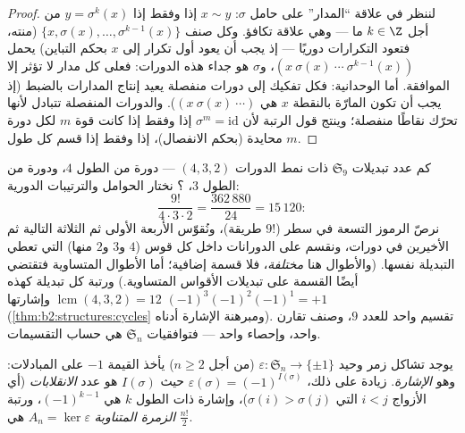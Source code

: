 \begin{proof}
لننظر في علاقة ``المدار'' على حامل $\sigma$: $x \sim y$
إذا وفقط إذا $y = \sigma^k(x)$ من أجل $k \in \Z$ ما --- وهي علاقة
تكافؤ. وكل صنف $\{x, \sigma(x), \dots, \sigma^{k-1}(x)\}$
(منته، فتعود التكرارات دوريًا --- إذ يجب أن يعود أول تكرار
إلى $x$ بحكم التباين) يحمل  $(x\ \sigma(x)\
\cdots\ \sigma^{k-1}(x))$، و$\sigma$ هو جداء هذه
الدورات: فعلى كل مدار لا تؤثر إلا  الموافقة.
أما الوحدانية: فكل تفكيك إلى دورات منفصلة يعيد إنتاج المدارات
بالضبط (إذ يجب أن تكون  المارّة بالنقطة $x$ هي $(x\ \sigma(x)\ \cdots)$).
والدورات المنفصلة تتبادل لأنها تحرّك نقاطًا منفصلة؛ وينتج قول
الرتبة لأن $\sigma^m = \mathrm{id}$ إذا وفقط إذا كانت قوة
$m$ لكل دورة محايدة (بحكم الانفصال)، إذا وفقط إذا قسم كل طول $m$.
\end{proof}

\begin{example}[نمط الدورات بوصفه إحصاءً]\label{ex:b2:structures:cycletype}
كم عدد تبديلات $\mathfrak{S}_9$ ذات نمط الدورات
$(4, 3, 2)$ --- دورة من الطول $4$، ودورة من الطول $3$، ؟
نختار الحوامل والترتيبات الدورية:
\[
\frac{9!}{4\cdot 3\cdot 2}
= \frac{362\,880}{24} = 15\,120 :
\]
نرصّ الرموز التسعة في سطر ($9!$ طريقة)، ونُقوّس الأربعة
الأولى ثم الثلاثة التالية ثم الأخيرين في دورات، ونقسم على
الدورانات داخل كل قوس ($4$ و$3$ و$2$ منها) التي
تعطي التبديلة نفسها. (والأطوال هنا \emph{مختلفة}،
فلا قسمة إضافية؛ أما الأطوال المتساوية فتقتضي أيضًا
القسمة على تبديلات الأقواس المتساوية.) ورتبة كل تبديلة
كهذه $\operatorname{lcm}(4,3,2) = 12$ وإشارتها
$(-1)^3(-1)^2(-1)^1 = +1$
(\cref{thm:b2:structures:cycles} ومبرهنة الإشارة
أدناه). تقسيم واحد للعدد $9$، وصنف تقارن واحد، وإحصاء واحد
--- فتوافقيات $\mathfrak{S}_n$ هي حساب التقسيمات.
\end{example}

\begin{theorem}[الإشارة]\label{thm:b2:structures:signature}
يوجد تشاكل زمر وحيد $\varepsilon \colon
\mathfrak{S}_n \to \{\pm 1\}$ (من أجل $n \geq 2$) يأخذ القيمة $-1$
على المبادلات: وهو \emph{الإشارة}\index{إشارة}. زيادة على ذلك،
$\varepsilon(\sigma) = (-1)^{I(\sigma)}$ حيث $I(\sigma)$ هو
عدد \emph{الانقلابات} (أي الأزواج $i < j$ التي $\sigma(i) >
\sigma(j)$)، وإشارة
 ذات الطول $k$ هي $(-1)^{k-1}$، ورتبة \emph{الزمرة المتناوبة}
$A_n = \ker\varepsilon$ هي $\frac{n!}{2}$.
\end{theorem}

